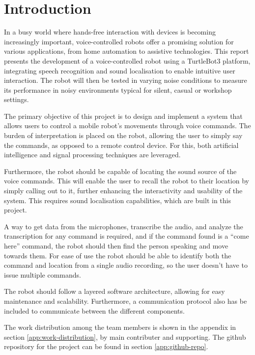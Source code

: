 \section{Introduction}
In a busy world where hands-free interaction with devices is becoming increasingly important, voice-controlled robots offer a promising solution for various applications, from home automation to assistive technologies. This report presents the development of a voice-controlled robot using a TurtleBot3 platform, integrating speech recognition and sound localisation to enable intuitive user interaction. The robot will then be tested in varying noise conditions to measure its performance in noisy environments typical for silent, casual or workshop settings.

The primary objective of this project is to design and implement a system that allows users to control a mobile robot's movements through voice commands. The burden of interpretation is placed on the robot, allowing the user to simply say the commands, as opposed to a remote control device. For this, both artificial intelligence and signal processing techniques are leveraged.

Furthermore, the robot should be capable of locating the sound source of the voice commands. This will enable the user to recall the robot to their location by simply calling out to it, further enhancing the interactivity and usability of the system. This requires sound localisation capabilities, which are built in this project. %

A way to get data from the microphones, transcribe the audio, and analyze the transcription for any command is required, and if the command found is a ``come here'' command, the robot should then find the person speaking and move towards them. For ease of use the robot should be able to identify both the command and location from a single audio recording, so the user doesn't have to issue multiple commands.

The robot should follow a layered software architecture, allowing for easy maintenance and scalability. Furthermore, a communication protocol also has be included to communicate between the different components.

The work distribution among the team members is shown in the appendix in section \ref{app:work-distribution}, by main contributer and supporting. The github repository for the project can be found in section \ref{app:github-repo}.